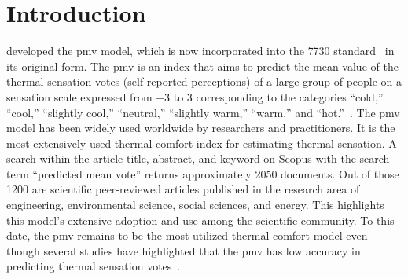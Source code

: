 \section{Introduction}\label{sec:introduction}
 developed the \ac{pmv} model, which is now incorporated into the \gls{7730} standard~\cite{iso7730} in its original form.
The \ac{pmv} is an index that aims to predict the mean value of the thermal sensation votes (self-reported perceptions) of a large group of people on a sensation scale expressed from \num{-3} to \num{3} corresponding to the categories ``cold,'' ``cool,'' ``slightly cool,'' ``neutral,'' ``slightly warm,'' ``warm,'' and ``hot.''~\cite{iso7730, ashrae552023}.
The \ac{pmv} model has been widely used worldwide by researchers and practitioners.
It is the most extensively used thermal comfort index for estimating thermal sensation.
A search within the article title, abstract, and keyword on Scopus with the search term ``predicted mean vote'' returns approximately \num{2050} documents.
Out of those \num{1200} are scientific peer-reviewed articles published in the research area of engineering, environmental science, social sciences, and energy.
This highlights this model's extensive adoption and use among the scientific community.
To this date, the \ac{pmv} remains to be the most utilized thermal comfort model even though several studies have highlighted that the \ac{pmv} has low accuracy in predicting thermal sensation votes~\cite{Cheung2019, Yao2022, kim2019thermal, tartarini2018thermal, Humphreys2002, doherty_evaluation_1988, tartarini_prediction_2023}.

